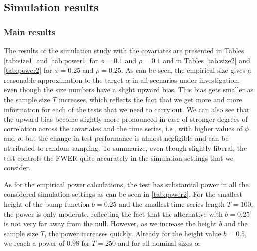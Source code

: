 \documentclass[a4paper,12pt]{article}
\begin{document}
\vspace{10pt}

{\small
\setlength{\bibsep}{0.55em}
}



\pagebreak
\subsection*{Simulation results}


\subsubsection*{Main results} 


The results of the simulation study with the covariates are presented in Tables \ref{tab:size1} and \ref{tab:power1} for $\phi = 0.1$ and $\rho = 0.1$ and in Tables \ref{tab:size2} and \ref{tab:power2} for $\phi = 0.25$ and $\rho = 0.25$. As can be seen, the empirical size gives a reasonable approximation to the target $\alpha$ in all scenarios under investigation, even though the size numbers have a slight upward bias. This bias gets smaller as the sample size $T$ increases, which reflects the fact that we get more and more information for each of the tests that we need to carry out. We can also see that the upward bias become slightly more pronounced in case of stronger degrees of correlation across the covariates and the time series, i.e., with higher values of $\phi$ and $\rho$, but the change in test performance is almost negligible and can be attributed to random sampling. To summarize, even though slightly liberal, the test controls the FWER quite accurately in the simulation settings that we consider.

As for the empirical power calculations, the test has substantial power in all the considered simulation settings as can be seen in \ref{tab:power2}. For the smallest height of the bump function $b = 0.25$ and the smallest time series length $T = 100$, the power is only moderate, reflecting the fact that the alternative with $b = 0.25$ is not very far away from the null. However, as we increase the height $b$ and the sample size $T$, the power increases quickly. Already for the height value $b = 0.5$, we reach a power of $0.98$ for $T = 250$ and for all nominal sizes $\alpha$.
 
\end{document}
